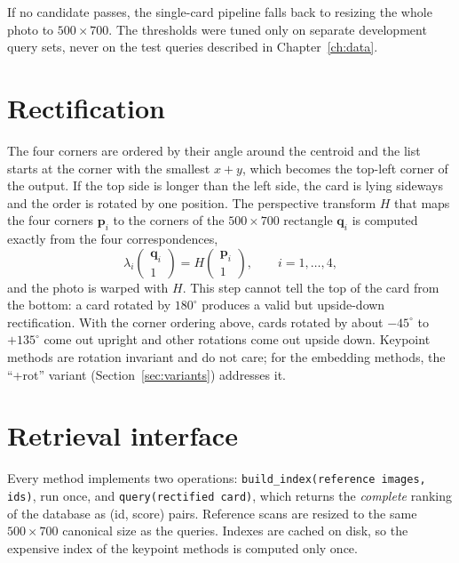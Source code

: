If no candidate passes, the single-card pipeline falls back to resizing the whole photo to $500\times700$. The thresholds were tuned only on separate development query sets, never on the test queries described in Chapter~\ref{ch:data}.

\section{Rectification}
\label{sec:rectification}

The four corners are ordered by their angle around the centroid and the list starts at the corner with the smallest $x+y$, which becomes the top-left corner of the output. If the top side is longer than the left side, the card is lying sideways and the order is rotated by one position. The perspective transform $H$ that maps the four corners $\mathbf{p}_i$ to the corners of the $500\times700$ rectangle $\mathbf{q}_i$ is computed exactly from the four correspondences,
\begin{equation}
  \lambda_i \begin{pmatrix} \mathbf{q}_i \\ 1 \end{pmatrix} = H \begin{pmatrix} \mathbf{p}_i \\ 1 \end{pmatrix}, \qquad i = 1,\dots,4,
  \label{eq:homography}
\end{equation}
and the photo is warped with $H$. This step cannot tell the top of the card from the bottom: a card rotated by $180^\circ$ produces a valid but upside-down rectification. With the corner ordering above, cards rotated by about $-45^\circ$ to $+135^\circ$ come out upright and other rotations come out upside down. Keypoint methods are rotation invariant and do not care; for the embedding methods, the ``+rot'' variant (Section~\ref{sec:variants}) addresses it.

\section{Retrieval interface}

Every method implements two operations: \texttt{build\_index(reference images, ids)}, run once, and \texttt{query(rectified card)}, which returns the \emph{complete} ranking of the database as (id, score) pairs. Reference scans are resized to the same $500\times700$ canonical size as the queries. Indexes are cached on disk, so the expensive index of the keypoint methods is computed only once.

